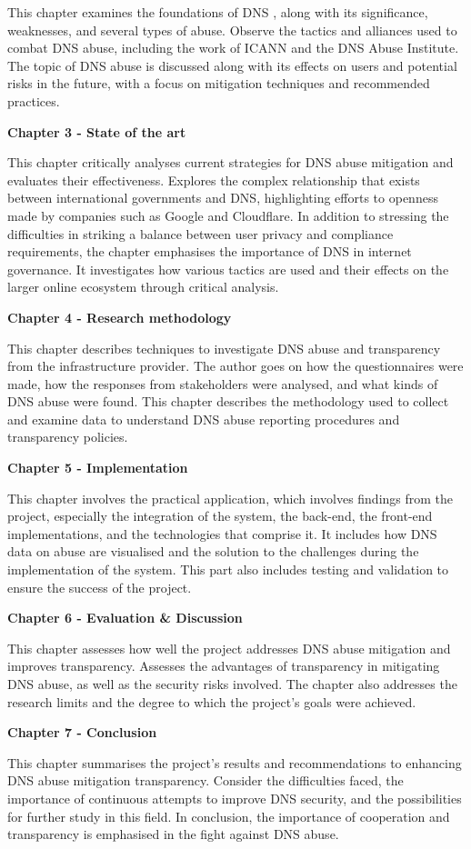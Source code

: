 This chapter examines the foundations of DNS , along with its significance, weaknesses, and several types of abuse. Observe the tactics and alliances used to combat DNS abuse, including the work of ICANN and the DNS Abuse Institute. The topic of DNS abuse is discussed along with its effects on users and potential risks in the future, with a focus on mitigation techniques and recommended practices.

\textbf{Chapter 3 -  State of the art }

This chapter critically analyses current strategies for DNS abuse mitigation and evaluates their effectiveness. Explores the complex relationship that exists between international governments and DNS, highlighting efforts to openness made by companies such as Google and Cloudflare. In addition to stressing the difficulties in striking a balance between user privacy and compliance requirements, the chapter emphasises the importance of DNS in internet governance. It investigates how various tactics are used and their effects on the larger online ecosystem through critical analysis.

\textbf{Chapter 4 -  Research methodology }

This chapter describes techniques to investigate DNS abuse and transparency from the infrastructure provider. The author goes on how the questionnaires were made, how the responses from stakeholders were analysed, and what kinds of DNS abuse were found. This chapter describes the methodology used to collect and examine data to understand DNS abuse reporting procedures and transparency policies.

\textbf{Chapter 5 -  Implementation }

This chapter involves the practical application, which involves findings from the project, especially the integration of the system, the back-end, the front-end implementations, and the technologies that comprise it. It includes how DNS data on abuse are visualised and the solution to the challenges during the implementation of the system. This part also includes testing and validation to ensure the success of the project.

\textbf{Chapter 6 -  Evaluation \& Discussion }

This chapter assesses how well the project addresses DNS abuse mitigation and improves transparency. Assesses the advantages of transparency in mitigating DNS abuse, as well as the security risks involved. The chapter also addresses the research limits and the degree to which the project's goals were achieved.

\textbf{Chapter 7 -  Conclusion }

This chapter summarises the project's results and recommendations to enhancing DNS abuse mitigation transparency. Consider the difficulties faced, the importance of continuous attempts to improve DNS security, and the possibilities for further study in this field. In conclusion, the importance of cooperation and transparency is emphasised in the fight against DNS abuse. 
